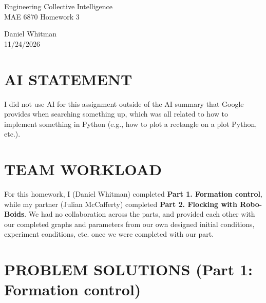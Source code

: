 \documentclass[11pt]{article}
\newcommand{\mainmatter}{\clearpage\setcounter{page}{1}\pagenumbering{arabic}}
\begin{document}
\begin{titlepage}
\begin{center}
    \vspace*{\fill}
    {\Huge Engineering Collective Intelligence}\\
    {\large MAE 6870 Homework 3}

    \vspace{4\baselineskip}
    Daniel Whitman\\
    11/24/2026
\end{center}


\vspace*{\fill}
\end{titlepage}


\mainmatter
\section*{AI STATEMENT}
I did not use AI for this assignment outside of the AI summary that Google provides when searching something up, which was all related to how to implement something in Python (e.g., how to plot a rectangle on a plot Python, etc.).

\section*{TEAM WORKLOAD}
For this homework, I (Daniel Whitman) completed \textbf{Part 1. Formation control}, while my partner (Julian McCafferty) completed \textbf{Part 2. Flocking with Robo-Boids}. We had no collaboration across the parts, and provided each other with our completed graphs and parameters from our own designed initial conditions, experiment conditions, etc. once we were completed with our part.

\section*{PROBLEM SOLUTIONS (Part 1: Formation control)}
\end{document}
